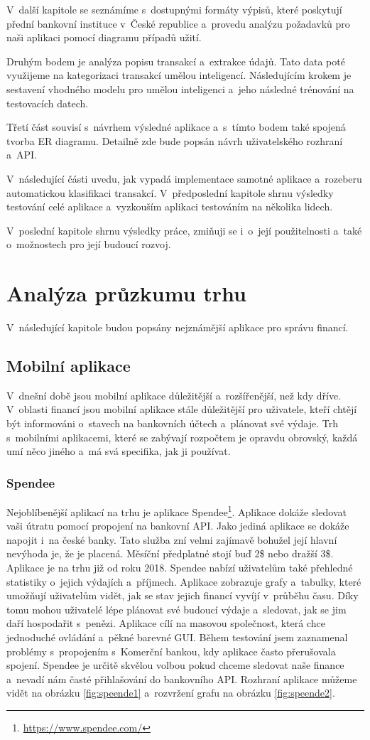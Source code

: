 V~další kapitole se seznámíme s~dostupnými formáty výpisů, které poskytují přední bankovní instituce v~České republice a~provedu analýzu požadavků pro naši aplikaci pomocí diagramu případů užití.

Druhým bodem je analýza popisu transakcí a~extrakce údajů. Tato data poté využijeme na kategorizaci transakcí umělou inteligencí. Následujícím krokem je sestavení vhodného modelu pro umělou inteligenci a~jeho následné trénování na testovacích datech.

Třetí část souvisí s~návrhem výsledné aplikace a~s~tímto bodem také spojená tvorba ER diagramu. Detailně zde bude popsán návrh uživatelského rozhraní a~API.

V~následující části uvedu, jak vypadá implementace samotné aplikace a~rozeberu automatickou klasifikaci transakcí.
V~předposlední kapitole shrnu výsledky testování celé aplikace a~vyzkouším aplikaci testováním na několika lidech.

V~poslední kapitole shrnu výsledky práce, zmiňuji se i~o~její použitelnosti a~také o~možnostech pro její budoucí rozvoj.

\chapter{Analýza průzkumu trhu}
V~následující kapitole budou popsány nejznámější aplikace pro správu financí. 
\section{Mobilní aplikace}
V~dnešní době jsou mobilní aplikace důležitější a~rozšířenější, než kdy dříve. V~oblasti financí jsou mobilní aplikace stále důležitější pro uživatele, kteří chtějí být informováni o~stavech na bankovních účtech a~plánovat své výdaje. Trh s~mobilními aplikacemi, které se zabývají rozpočtem je opravdu obrovský, každá umí něco jiného a~má svá specifika, jak ji používat.
\subsection*{Spendee}
Nejoblíbenější aplikací na trhu je aplikace Spendee\footnote{\url{https://www.spendee.com/}}. Aplikace dokáže sledovat vaši útratu pomocí propojení na bankovní API. Jako jediná aplikace se dokáže napojit i~na české banky. Tato služba zní velmi zajímavě bohužel její hlavní nevýhoda je, že je placená. Měsíční předplatné stojí buď 2\$ nebo dražší 3\$. Aplikace je na trhu již od roku 2018. Spendee nabízí uživatelům také přehledné statistiky o~jejich výdajích a~příjmech. Aplikace zobrazuje grafy a~tabulky, které umožňují uživatelům vidět, jak se stav jejich financí vyvíjí v~průběhu času. Díky tomu mohou uživatelé lépe plánovat své budoucí výdaje a~sledovat, jak se jim daří hospodařit s~penězi. Aplikace cílí na masovou společnost, která chce jednoduché ovládání a~pěkné barevné GUI. Během testování jsem zaznamenal problémy s~propojením s~Komerční bankou, kdy aplikace často přerušovala spojení. Spendee je určitě skvělou volbou pokud chceme sledovat naše finance a~nevadí nám časté přihlašování do bankovního API. Rozhraní aplikace můžeme vidět na obrázku \ref{fig:speende1} a~rozvržení grafu na obrázku \ref{fig:speende2}.

